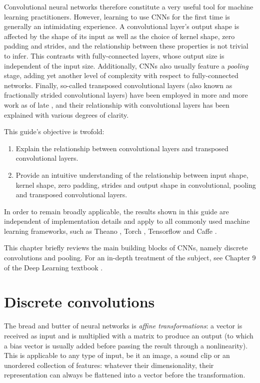 \documentclass[notitlepage]{report}
\begin{document}
Convolutional neural networks therefore constitute a very useful tool for
machine learning practitioners. However, learning to use CNNs for the first time
is generally an intimidating experience. A convolutional layer's output shape is
affected by the shape of its input as well as the choice of kernel shape, zero
padding and strides, and the relationship between these properties is not
trivial to infer. This contrasts with fully-connected layers, whose output size
is independent of the input size. Additionally, CNNs also usually feature a {\em
pooling\/} stage, adding yet another level of complexity with respect to
fully-connected networks.  Finally, so-called transposed convolutional layers
(also known as fractionally strided convolutional layers) have been employed in
more and more work as of late \citep{zeiler2011adaptive,zeiler2014visualizing,
long2015fully,radford2015unsupervised,visin15,im2016generating}, and their
relationship with convolutional layers has been explained with various degrees
of clarity.

This guide's objective is twofold:

\begin{enumerate}
    \item Explain the relationship between convolutional layers and transposed
        convolutional layers.
    \item Provide an intuitive understanding of the relationship between input
        shape, kernel shape, zero padding, strides and output shape in
        convolutional, pooling and transposed convolutional layers.
\end{enumerate}

In order to remain broadly applicable, the results shown in this guide are
independent of implementation details and apply to all commonly used machine
learning frameworks, such as Theano
\citep{bergstra2010theano,bastien2012theano}, Torch \citep{collobert2011torch7},
Tensorflow \citep{abaditensorflow} and Caffe \citep{jia2014caffe}.

This chapter briefly reviews the main building blocks of CNNs, namely discrete
convolutions and pooling. For an in-depth treatment of the subject, see Chapter
9 of the Deep Learning textbook \citep{Goodfellow-et-al-2016-Book}.

\section{Discrete convolutions}

The bread and butter of neural networks is \emph{affine transformations}: a
vector is received as input and is multiplied with a matrix to produce an
output (to which a bias vector is usually added before passing the result
through a nonlinearity). This is applicable to any type of input, be it an
image, a sound clip or an unordered collection of features: whatever their
dimensionality, their representation can always be flattened into a vector
before the transformation.
\end{document}
